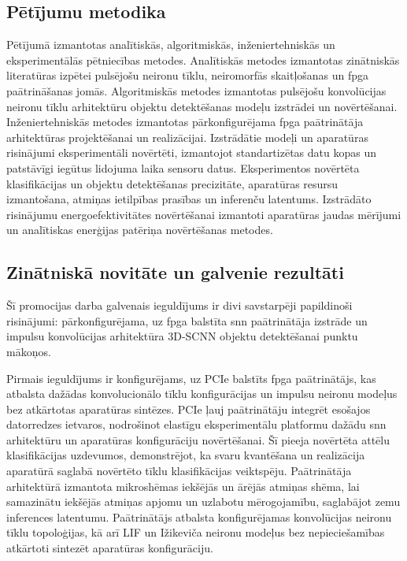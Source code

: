 \subsection{Pētījumu metodika}
Pētījumā izmantotas analītiskās, algoritmiskās, inženiertehniskās un eksperimentālās pētniecības metodes. Analītiskās metodes
izmantotas zinātniskās literatūras izpētei pulsējošu neironu tīklu, neiromorfās skaitļošanas un \Gls{fpga} paātrināšanas jomās.
Algoritmiskās metodes izmantotas pulsējošu konvolūcijas neironu tīklu arhitektūru objektu
detektēšanas modeļu izstrādei un novērtēšanai. Inženiertehniskās metodes izmantotas pārkonfigurējama \Gls{fpga} paātrinātāja
arhitektūras projektēšanai un realizācijai. Izstrādātie modeļi un aparatūras
risinājumi eksperimentāli novērtēti, izmantojot standartizētas datu kopas un patstāvīgi iegūtus lidojuma laika sensoru datus.
Eksperimentos novērtēta klasifikācijas un objektu detektēšanas precizitāte, aparatūras resursu izmantošana, atmiņas
ietilpības prasības un inferenču latentums. Izstrādāto risinājumu energoefektivitātes novērtēšanai izmantoti aparatūras
jaudas mērījumi un analītiskas enerģijas patēriņa novērtēšanas metodes.

\subsection{Zinātniskā novitāte un galvenie rezultāti}
Šī promocijas darba galvenais ieguldījums ir divi savstarpēji papildinoši risinājumi: pārkonfigurējama, uz \Gls{fpga}
balstīta \Gls{snn} paātrinātāja izstrāde un impulsu konvolūcijas arhitektūra 3D-SCNN objektu detektēšanai punktu mākoņos.

Pirmais ieguldījums ir konfigurējams, uz PCIe balstīts \Gls{fpga} paātrinātājs, kas atbalsta dažādas konvolucionālo tīklu
konfigurācijas un impulsu neironu modeļus bez atkārtotas aparatūras sintēzes. PCIe ļauj paātrinātāju integrēt esošajos
datorredzes ietvaros, nodrošinot elastīgu eksperimentālu platformu dažādu \Gls{snn} arhitektūru un aparatūras konfigurāciju
novērtēšanai. Šī pieeja novērtēta attēlu klasifikācijas uzdevumos, demonstrējot, ka svaru kvantēšana un realizācija
aparatūrā saglabā novērtēto tīklu klasifikācijas veiktspēju. Paātrinātāja arhitektūrā izmantota mikroshēmas iekšējās un
ārējās atmiņas shēma, lai samazinātu iekšējās atmiņas apjomu un uzlabotu mērogojamību, saglabājot zemu inferences latentumu.
Paātrinātājs atbalsta konfigurējamas konvolūcijas neironu tīklu topoloģijas, kā arī LIF un Ižikeviča neironu modeļus bez
nepieciešamības atkārtoti sintezēt aparatūras konfigurāciju.

